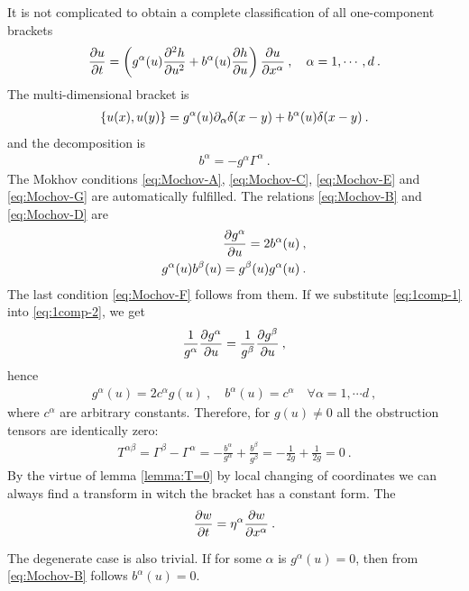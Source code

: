 \begin{example}

It is not complicated to obtain a complete classification of all one-component brackets
\begin{align}
    \frac{\partial u}{\partial t} = \left( g^{\alpha}(u) \frac{\partial ^2h}{\partial u^2} + b^{\alpha}(u) \frac{\partial h}{\partial u} \right) \frac{\partial u}{\partial x^\alpha} \:, \quad \alpha = 1, \cdots, d \:.
\end{align}
The multi-dimensional bracket is 
\begin{align}
    \left \lbrace u(x),u(y) \right \rbrace = g^{\alpha}(u) \partial_\alpha \delta(x-y) + b^\alpha(u) \delta(x-y) \:.
\end{align}
and the decomposition is
\begin{align}
    b^\alpha = - g^\alpha \Gamma^\alpha \:.
\end{align}
The Mokhov conditions \eqref{eq:Mochov-A}, \eqref{eq:Mochov-C}, \eqref{eq:Mochov-E} and \eqref{eq:Mochov-G} are automatically fulfilled. The relations \eqref{eq:Mochov-B} and \eqref{eq:Mochov-D} are
\begin{align}
    \frac{\partial g^\alpha}{\partial u} = 2 b^\alpha(u) \:, \label{eq:1comp-1} \\
    g^\alpha(u) b^\beta(u) = g^\beta(u) g^\alpha(u) \label{eq:1comp-2}\:.
\end{align}
The last condition \eqref{eq:Mochov-F} follows from them. If we substitute \eqref{eq:1comp-1} into \eqref{eq:1comp-2}, we get
\begin{align}
    \frac{1}{g^\alpha} \frac{\partial g^\alpha}{\partial u}= \frac{1}{g^\beta}\frac{\partial g^\beta}{\partial u} \:,
\end{align}
hence
\begin{align}
    g^\alpha(u) = 2c^\alpha g(u) \:, \quad b^\alpha(u) = c^\alpha \quad \forall \alpha = 1, \cdots d \:,
\end{align}
where $c^\alpha$ are arbitrary constants.
Therefore, for $g(u) \neq 0$ all the obstruction tensors are identically zero:
\begin{align}
    T^{\alpha \beta} = \Gamma^\beta - \Gamma^\alpha = -\frac{b^\alpha}{g^\alpha} + \frac{b^\beta}{g^\beta} = - \frac{1}{2 g} + \frac{1}{2g} = 0 \:.
\end{align}
By the virtue of lemma \vref{lemma:T=0} by local changing of coordinates we can always find a transform in witch the bracket has a constant form. The 
\begin{align}
    \frac{\partial w}{\partial t} = \eta^\alpha \frac{\partial w}{\partial x^\alpha} \:.
\end{align}

The degenerate case is also trivial. If for some $\alpha$ is $g^\alpha(u) = 0$, then from \eqref{eq:Mochov-B} follows $b^\alpha(u) = 0$.

\end{example}

